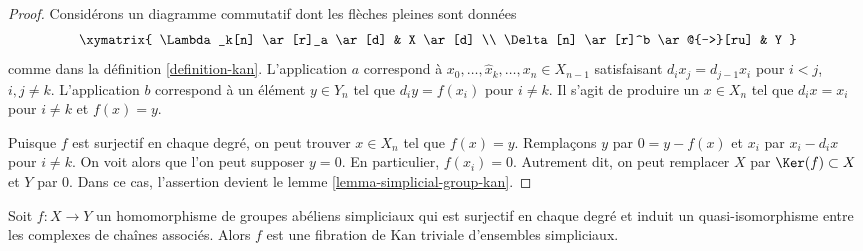 \begin{proof}
Considérons un diagramme commutatif dont les flèches pleines sont données
$$
\xymatrix{
\Lambda_k[n] \ar[r]_a \ar[d] & X \ar[d] \\
\Delta[n] \ar[r]^b \ar@{-->}[ru] & Y
}
$$
comme dans la définition \ref{definition-kan}. L'application $a$ correspond
à $x_0, \ldots, \hat x_k, \ldots, x_n \in X_{n - 1}$ satisfaisant
$d_i x_j = d_{j - 1} x_i$ pour $i < j$, $i, j \not = k$.
L'application $b$ correspond à un élément $y \in Y_n$ tel
que $d_iy = f(x_i)$ pour $i \not = k$. Il s'agit de produire un
$x \in X_n$ tel que $d_ix = x_i$ pour $i \not = k$ et $f(x) = y$.

\medskip\noindent
Puisque $f$ est surjectif en chaque degré, on peut trouver $x \in X_n$ tel que
$f(x) = y$. Remplaçons $y$ par $0 = y - f(x)$ et $x_i$ par $x_i - d_ix$
pour $i \not = k$. On voit alors que l'on peut supposer $y = 0$. En
particulier, $f(x_i) = 0$. Autrement dit, on peut remplacer $X$ par
$\Ker(f) \subset X$ et $Y$ par $0$. Dans ce cas, l'assertion devient le
lemme \ref{lemma-simplicial-group-kan}.
\end{proof}

\begin{lemma}
\label{lemma-qis-simplicial-abelian-groups}
Soit $f : X \to Y$ un homomorphisme de groupes abéliens simpliciaux
qui est surjectif en chaque degré et induit un quasi-isomorphisme entre les
complexes de chaînes associés. Alors $f$ est une fibration de Kan triviale
d'ensembles simpliciaux.
\end{lemma}

